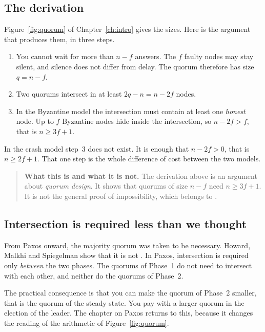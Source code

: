 \subsection{The derivation}

Figure~\ref{fig:quorum} of Chapter~\ref{ch:intro} gives the sizes. Here
is the argument that produces them, in three steps.

\begin{enumerate}
  \item You cannot wait for more than $n-f$ answers. The $f$ faulty
  nodes may stay silent, and silence does not differ from delay. The
  quorum therefore has size $q = n-f$.
  \item Two quorums intersect in at least $2q - n = n - 2f$ nodes.
  \item In the Byzantine model the intersection must contain at least
  one \emph{honest} node. Up to $f$ Byzantine nodes hide inside the
  intersection, so $n - 2f > f$, that is $n \ge 3f+1$.
\end{enumerate}

In the crash model step~3 does not exist. It is enough that
$n - 2f > 0$, that is $n \ge 2f+1$. That one step is the whole
difference of cost between the two models.

\begin{quote}\small
\textbf{What this is and what it is not.} The derivation above is an
argument about \emph{quorum design}. It shows that quorums of size $n-f$
need $n \ge 3f+1$. It is not the general proof of impossibility, which
belongs to \cite{pease1980reaching}.
\end{quote}

\subsection{Intersection is required less than we thought}

From Paxos onward, the majority quorum was taken to be necessary.
Howard, Malkhi and Spiegelman show that it is not
\cite{howard2016flexiblepaxos}. In Paxos, intersection is required only
\emph{between} the two phases. The quorums of Phase~1 do not need to
intersect with each other, and neither do the quorums of Phase~2.

The practical consequence is that you can make the quorum of Phase~2
smaller, that is the quorum of the steady state. You pay with a larger
quorum in the election of the leader. The chapter on Paxos returns to
this, because it changes the reading of the arithmetic of
Figure~\ref{fig:quorum}.

